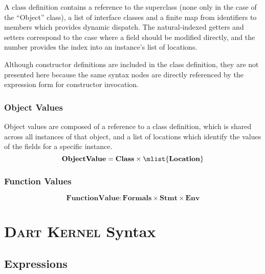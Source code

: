 \documentclass[a4paper,oneside,fleqn]{article}
\newcommand{\kernel}{\textsc{Dart Kernel}}
\newcommand{\synt}[1]{\ensuremath{\text{\textbf{\texttt{#1}}}}}
\newcommand{\dstmt}{\mathbf{Stmt}}
\newcommand{\denv}{\mathbf{Env}}
\newcommand{\dfunval}{\mathbf{FunctionValue}}
\newcommand{\dobjval}{\mathbf{ObjectValue}}
\newcommand{\dclass}{\mathbf{Class}}
\newcommand{\dformals}{\mathbf{Formals}}
\begin{document}
A class definition contains a reference to the superclass (none only in the case of the ``Object'' class), a list of interface classes and a finite map from identifiers to members which provides dynamic dispatch.
The natural-indexed getters and setters correspond to the case where a field should be modified directly, and the number provides the index into an instance's list of locations.

Although constructor definitions are included in the class definition, they are not presented here because the same syntax nodes are directly referenced by the expression form for constructor invocation.


\subsubsection{Object Values}
\label{subsec:object-values}

Object values are composed of a reference to a class definition, which is shared across all instances of that object, and a list of locations which identify the values of the fields for a specific instance.
\[
    \dobjval = \dclass \times \mlist{\dlocation}
\]

\subsubsection{Function Values}
\label{subsec:function-values}
\[
    \dfunval : \dformals \times \dstmt \times \denv
\]


\section{\kernel{} Syntax}
\label{sec:definitions}


\subsection{Expressions}
\label{sec:expr-syntax}


\newcommand{\VariableGet}[1]{#1}
\newcommand{\VariableSet}[2]{#1=#2}

\newcommand{\PropertyGet}[2]{#1.#2}
\newcommand{\PropertySet}[3]{#1.#2=#3}

\newcommand{\DirectPropertyGet}[2]{#1.\{#2\}}
\newcommand{\DirectPropertySet}[3]{#1.\{#2\}=#3}

\newcommand{\SuperPropertyGet}[1]{\synt{super}.#1}
\newcommand{\SuperPropertySet}[2]{\synt{super}.#1=#2}
\end{document}
